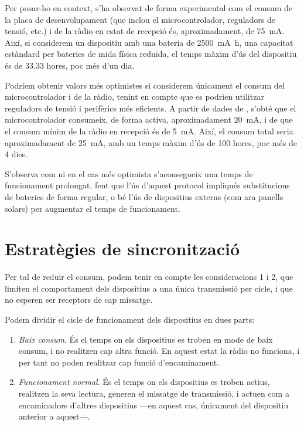 \documentclass{tfgitic}[2024/07/01]
\begin{document}
{Per posar-ho en context, s'ha observat de forma experimental com el consum de la placa de desenvolupament (que inclou el microcontrolador, reguladors de tensió, etc.) i de la ràdio en estat de recepció és, aproximadament, de \SI{75}{\milli\ampere}. Així, si considerem un dispositiu amb una bateria de \SI{2500}{\milli\ampere\hour}, una capacitat estàndard per bateries de mida física reduïda, el temps màxim d'ús del dispositiu és de 33.33 hores, poc més d'un dia.

Podríem obtenir valors més optimistes si considerem únicament el consum del microcontrolador i de la ràdio, tenint en compte que es podrien utilitzar reguladors de tensió i perifèrics més eficients. A partir de dades de \cite{espressif_current_nodate}, s'obté que el microcontrolador consumeix, de forma activa, aproximadament \SI{20}{\milli\ampere}, i de \cite{semtech_sx1262_nodate} que el consum mínim de la ràdio en recepció és de \SI{5}{\milli\ampere}. Així, el consum total seria aproximadament de \SI{25}{\milli\ampere}, amb un temps màxim d'ús de 100 hores, poc més de 4 dies.

S'observa com ni en el cas més optimista s'aconsegueix una temps de funcionament prolongat, fent que l'ús d'aquest protocol impliqués substitucions de bateries de forma regular, o bé l'ús de dispositius externs (com ara panells solars) per augmentar el temps de funcionament. 

\section{Estratègies de sincronització}
\label{section:estrategiesSync}
Per tal de reduir el consum, podem tenir en compte les consideracions 1 i 2, que limiten el comportament dels dispositius a una única transmissió per cicle, i que no esperen ser receptors de cap missatge. 

Podem dividir el cicle de funcionament dels dispositius en dues parts:
\begin{enumerate}
    \item \emph{Baix consum}. És el temps on els dispositius es troben en mode de baix consum, i no realitzen cap altra funció. En aquest estat la ràdio no funciona, i per tant no poden realitzar cap funció d'encaminament.
    \item \emph{Funcionament normal}. És el temps on els dispositius es troben actius, realitzen la seva lectura, generen el missatge de transmissió, i actuen com a encaminadors d'altres dispositius ---en aquest cas, únicament del dispositiu anterior a aquest---. 
\end{enumerate}

}
\end{document}
